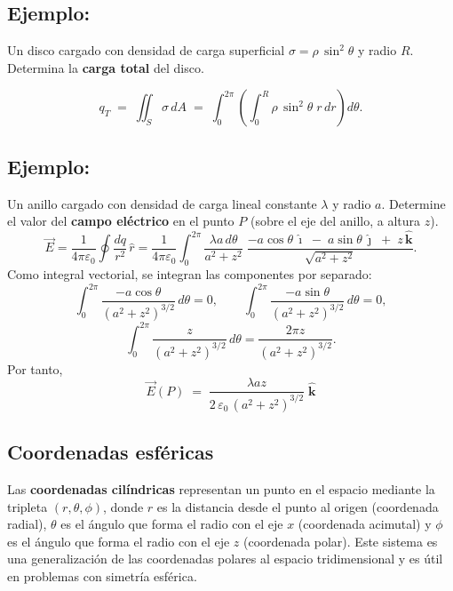 \documentclass[a4paper,12pt]{article}
\begin{document}
\subsection*{Ejemplo:}

\noindent
Un disco cargado con densidad de carga superficial $\sigma=\rho\,\sin^{2}\theta$ y radio $R$.  
Determina la \textbf{carga total} del disco.

\[
q_T \;=\; \iint_{S} \sigma\, dA
   \;=\; \int_{0}^{2\pi}\!\left(\int_{0}^{R} \rho\,\sin^{2}\theta \; r\,dr\right)\! d\theta .
\]

\subsection*{Ejemplo:}
\noindent
Un anillo cargado con densidad de carga lineal constante $\lambda$ y radio $a$.  
Determine el valor del \textbf{campo eléctrico} en el punto $P$ (sobre el eje del anillo, a altura $z$).
\[
\vec E
= \frac{1}{4\pi\varepsilon_0}\oint \frac{dq}{r^2}\,\hat r
= \frac{1}{4\pi\varepsilon_0}\int_{0}^{2\pi}
   \frac{\lambda a\, d\theta}{a^{2}+z^{2}}\;
   \frac{-a\cos\theta\,\hat{\imath}\;-\;a\sin\theta\,\hat{\jmath}\;+\;z\,\hat{\mathbf k}}
        {\sqrt{a^{2}+z^{2}}}.
\]
Como integral vectorial, se integran las componentes por separado:
\[
\int_{0}^{2\pi} \frac{-a\cos\theta}{(a^{2}+z^{2})^{3/2}}\, d\theta = 0, \qquad
\int_{0}^{2\pi} \frac{-a\sin\theta}{(a^{2}+z^{2})^{3/2}}\, d\theta = 0,
\]
\[
\int_{0}^{2\pi} \frac{z}{(a^{2}+z^{2})^{3/2}}\, d\theta
= \frac{2\pi z}{(a^{2}+z^{2})^{3/2}}.
\]
Por tanto,
\[
\boxed{\;
\vec E(P) \;=\; \frac{\lambda a z}{2\,\varepsilon_0\,(a^{2}+z^{2})^{3/2}}\;\hat{\mathbf k}
\;}
\]
\newpage
\subsection{Coordenadas esféricas}
\noindent
Las \textbf{coordenadas cilíndricas} representan un punto en el espacio mediante la tripleta
 $(r,\theta,\phi)$, donde $r$ es la distancia desde el punto al origen (coordenada radial),
  $\theta$ es el ángulo que forma el radio con el eje $x$ (coordenada acimutal) y $\phi$ es el
   ángulo que forma el radio con el eje $z$ (coordenada polar). Este sistema es una generalización
    de las coordenadas polares al espacio tridimensional y es útil en problemas con simetría esférica.\\
\end{document}
